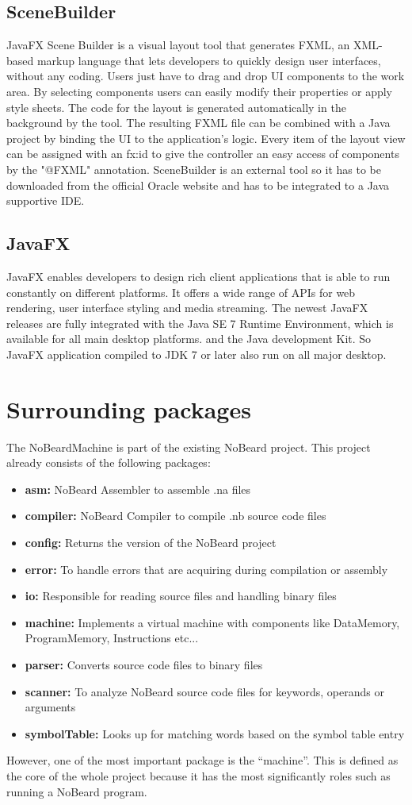 \subsection{SceneBuilder} \label{ssec:SceneBuilder}
JavaFX Scene Builder is a visual layout tool that generates FXML, an XML-based markup language that lets developers to quickly design user interfaces, without any coding. Users just have to drag and drop UI components to the work area. By selecting components users can easily modify their properties or apply style sheets. The code for the layout is generated automatically in the background by the tool. The resulting FXML file can be combined with a Java project by binding the UI to the application’s logic. Every item of the layout view can be assigned with an fx:id to give the controller an easy access of components by the "@FXML" annotation.  SceneBuilder is an external tool so it has to be downloaded from the official Oracle website and has to be integrated to a Java supportive IDE. 
\subsection{JavaFX}
JavaFX enables developers to design rich client applications that is able to run constantly on different platforms. It offers a wide range of APIs for web rendering, user interface styling and media streaming. The newest JavaFX releases are fully integrated with the Java SE 7 Runtime Environment, which is available for all main desktop platforms. and the Java development Kit. So JavaFX application compiled to JDK 7 or later also run on all major desktop. 
\section{Surrounding packages}
The NoBeardMachine is part of the existing NoBeard project. This project already consists of the following packages:
\begin{itemize}
\item \textbf{asm: }NoBeard Assembler to assemble .na files 
\item \textbf{compiler: }NoBeard Compiler to compile .nb source code files
\item \textbf{config: }Returns the version of the NoBeard project
\item \textbf{error: }To handle errors that are acquiring during compilation or assembly   
\item \textbf{io: }Responsible for reading source files and handling binary files 
\item \textbf{machine: }Implements a virtual machine with components like DataMemory, ProgramMemory, Instructions etc...  
\item \textbf{parser: }Converts source code files to binary files
\item \textbf{scanner: }To analyze NoBeard source code files for keywords, operands or arguments  
\item \textbf{symbolTable: }Looks up for matching words based on the symbol table entry  
\end{itemize}
However, one of the most important package is the “machine”. This is defined as the core of the whole project because it has the most significantly roles such as running a NoBeard program.
